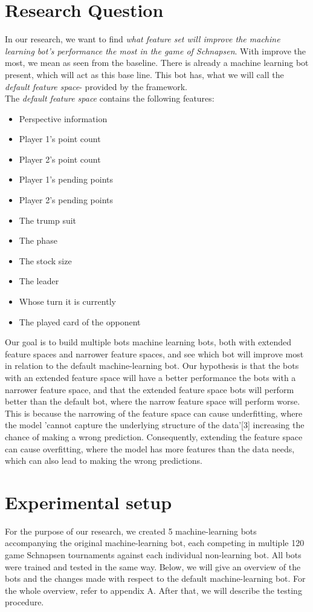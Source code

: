 \documentclass[a4paper,11pt]{article}
\begin{document}
\clearpage
\section{Research Question}
In our research, we want to find \textit{what feature set will improve the machine learning bot's performance the most in the game of Schnapsen}. With improve the most, we mean as seen from the baseline. There is already a machine learning bot present, which will act as this base line. This bot has, what we will call the \textit{default feature space}- provided by the framework.  \\

\noindent
The \textit{default feature space} contains the following features:
\begin{itemize}
\item Perspective information
\item Player 1's point count
\item Player 2's point count
\item Player 1's pending points
\item Player 2's pending points
\item The trump suit
\item The phase
\item The stock size
\item The leader
\item Whose turn it is currently
\item The played card of the opponent
\end{itemize}



\noindent
Our goal is to build multiple bots machine learning bots, both with extended feature spaces and narrower feature spaces, and see which bot will improve most in relation to the default machine-learning bot. Our hypothesis is that the bots with an extended feature space will have a better performance the bots with a narrower feature space, and that the extended feature space bots will perform better than the default bot, where the narrow feature space will perform worse. This is because the narrowing of the feature space can cause underfitting, where the model 'cannot capture the underlying structure of the data'[3] increasing the chance of making a wrong prediction. Consequently, extending the feature space can cause overfitting, where the model has more features than the data needs, which can also lead to making the wrong predictions.


\clearpage
\section{Experimental setup}
For the purpose of our research, we created 5 machine-learning bots accompanying the original machine-learning bot, each competing in multiple 120 game Schnapsen tournaments against each individual non-learning bot. All bots were trained and tested in the same way. Below, we will give an overview of the bots and the changes made with respect to the default machine-learning bot. For the whole overview, refer to appendix A. After that, we will describe the testing procedure.
\end{document}
